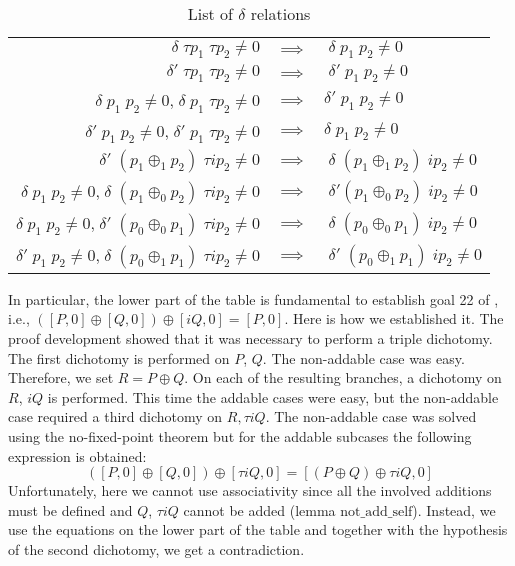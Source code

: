 \documentclass[runningheads]{llncs}
\begin{document}
\begin{table}
\begin{center}
	\begin{tabular}{ r c l }
 $\delta \; \tau p_1 \; \tau p_2 \neq 0$ & $\implies$ & $\; \delta \; p_1 \; p_2 \neq 0$ \\ 
 $\delta' \; \tau p_1 \; \tau p_2 \neq 0$ & $\implies$ & $\; \delta' \; p_1 \; p_2 \neq 0$ \\ 
 $\delta \; p_1 \; p_2 \neq 0$,$\; \delta \; p_1 \; \tau p_2 \neq 0$ & $\implies$ & $\delta' \; p_1 \; p_2 \neq 0$ \\ 
 $\delta' \; p_1 \; p_2 \neq 0$,$\; \delta' \; p_1 \; \tau p_2 \neq 0$ & $\implies$ & $\delta \; p_1 \;p_2 \neq 0$ \\ 
 \hline
 $\delta' \; (p_1 \oplus_1 p_2) \; \tau i p_2 \neq 0$ & $\implies$ & $\; \delta \; (p_1 \oplus_1 p_2) \; i p_2 \neq 0$ \\ 
 $\delta \; p_1 \; p_2 \neq 0$,$\; \delta \; (p_1 \oplus_0 p_2) \; \tau i p_2 \neq 0$ & $\implies$ & $\; \delta' (p_1 \oplus_0 p_2) \; i p_2 \neq 0$ \\ 
 $\delta \; p_1 \; p_2 \neq 0$,$\; \delta' \; (p_0 \oplus_0 p_1) \; \tau i p_2 \neq 0$ & $\implies$ & $\; \delta \; (p_0 \oplus_0 p_1) \; i p_2 \neq 0$ \\     
 $\delta' \; p_1 \; p_2 \neq 0$,$\; \delta \; (p_0 \oplus_1 p_1) \; \tau i p_2 \neq 0$ & $\implies$ & $\; \delta' \; (p_0 \oplus_1 p_1) \; i p_2 \neq 0$ \\
	\end{tabular}
\end{center}
	\caption{List of $\delta$ relations}
	\label{table:1}
\end{table}
%
In particular, the lower part of the table is fundamental to establish
goal 22 of \cite{hales2016group}, i.e., $([P,0] \oplus [Q,0]) \oplus
[iQ,0] = [P,0]$. Here is how we established it. The proof development
showed that it was necessary to perform a triple dichotomy. The first
dichotomy is performed on $P$, $Q$. The non-addable case was
easy. Therefore, we set $R = P \oplus Q$. On each of the resulting
branches, a dichotomy on $R$, $iQ$ is performed. This time the addable
cases were easy, but the non-addable case required a third dichotomy
on $R,\tau i Q$. The non-addable case was solved using the
no-fixed-point theorem but for the addable subcases the following
expression is obtained: $$([P,0] \oplus [Q,0]) \oplus [\tau i Q,0] =
[(P \oplus Q) \oplus \tau i Q,0]$$ Unfortunately, here we cannot use
associativity since all the involved additions must be defined and
$Q$, $\tau i Q$ cannot be added (lemma
$\text{not\_add\_self}$). Instead, we use the equations on the lower
part of the table and together with the hypothesis of the second
dichotomy, we get a contradiction.
\end{document}
